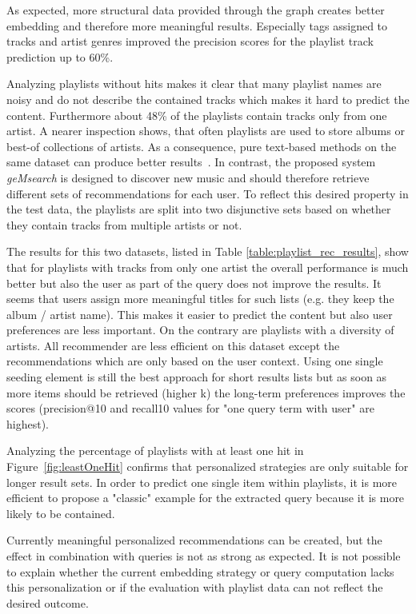 \documentclass[sigconf]{acmart}
\begin{document}
As expected, more structural data provided through the graph creates better embedding and therefore more meaningful results. Especially tags assigned to tracks and artist genres improved the precision scores for the playlist track prediction up to 60\%.


Analyzing playlists without hits makes it clear that many playlist names are noisy and do not describe the contained tracks which makes it hard to predict the content. Furthermore about 48\% of the playlists contain tracks only from one artist. A nearer inspection shows, that often playlists are used to store albums or best-of collections of artists. As a consequence, pure text-based methods on the same dataset can produce better results~\cite{chungexploiting}. In contrast, the proposed system \emph{geMsearch} is designed to discover new music and should therefore retrieve different sets of recommendations for each user. To reflect this desired property in the test data, the playlists are split into two disjunctive sets based on whether they contain tracks from multiple artists or not.

The results for this two datasets, listed in Table \ref{table:playlist_rec_results}, show that for playlists with tracks from only one artist the overall performance is much better but also the user as part of the query does not improve the results. It seems that users assign more meaningful titles for such lists (e.g. they keep the album / artist name). This makes it easier to predict the content but also user preferences are less important. 
On the contrary are playlists with a diversity of artists. All recommender are less efficient on this dataset except the recommendations which are only based on the user context. Using one single seeding element is still the best approach for short results lists but as soon as more items should be retrieved (higher k) the long-term preferences improves the scores (precision@10 and recall10 values for "one query term with user" are highest).

Analyzing the percentage of playlists with at least one hit in Figure~\ref{fig:leastOneHit} confirms that personalized strategies are only suitable for longer result sets. In order to predict one single item within playlists, it is more efficient to propose a "classic" example for the extracted query because it is more likely to be contained. %

Currently meaningful personalized recommendations can be created, but the effect in combination with queries is not as strong as expected. It is not possible to explain whether the current embedding strategy or query computation lacks this personalization or if the evaluation with playlist data can not reflect the desired outcome.
\end{document}
